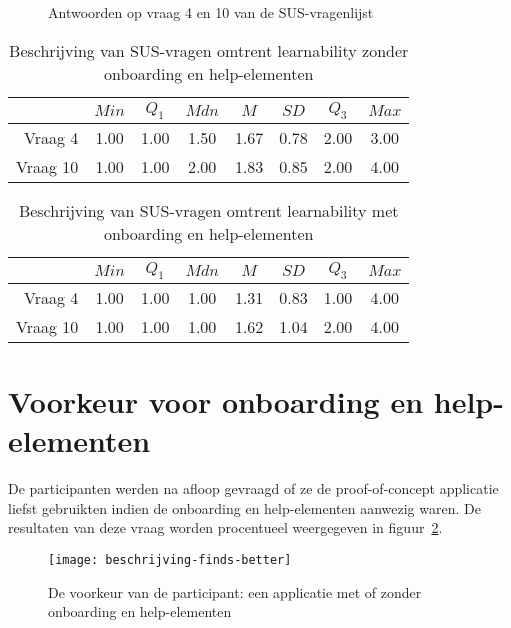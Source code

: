 \begin{figure}[h]
	\centering
	\qquad
	\caption{Antwoorden op vraag 4 en 10 van de SUS-vragenlijst}
	\label{fig:beschrijving-sus}
\end{figure}

\begin{table}[h]
	\centering
	\begin{tabular}{r|ccccccc}
		& $Min$ & $Q_1$ & $Mdn$ & $M$ & $SD$ & $Q_3$ & $Max$ \\ \hline
		Vraag 4 & 1.00 & 1.00 & 1.50 & 1.67 & 0.78 & 2.00 & 3.00 \\
		Vraag 10 & 1.00 & 1.00 & 2.00 & 1.83 & 0.85 & 2.00 & 4.00
	\end{tabular}
	\caption{Beschrijving van SUS-vragen omtrent learnability zonder onboarding en help-elementen}
	\label{tab:beschrijving-sus-learnability-1}
\end{table}

\begin{table}[h]
	\centering
	\begin{tabular}{r|ccccccc}
		& $Min$ & $Q_1$ & $Mdn$ & $M$ & $SD$ & $Q_3$ & $Max$ \\ \hline
		Vraag 4 & 1.00 & 1.00 & 1.00 & 1.31 & 0.83 & 1.00 & 4.00 \\
		Vraag 10 & 1.00 & 1.00 & 1.00 & 1.62 & 1.04 & 2.00 & 4.00
	\end{tabular}
	\caption{Beschrijving van SUS-vragen omtrent learnability met onboarding en help-elementen}
	\label{tab:beschrijving-sus-learnability-2}
\end{table}

\section{Voorkeur voor onboarding en help-elementen}
\label{sec:voorkeur-onboarding}

De participanten werden na afloop gevraagd of ze de proof-of-concept applicatie liefst gebruikten indien de onboarding en help-elementen aanwezig waren. De resultaten van deze vraag worden procentueel weergegeven in figuur~\ref{fig:beschrijving-finds-better}.

\begin{figure}[h]
    \centering
    \texttt{[image: beschrijving-finds-better]}
    \caption{De voorkeur van de participant: een applicatie met of zonder onboarding en help-elementen}
    \label{fig:beschrijving-finds-better}
\end{figure}

